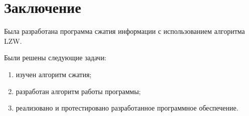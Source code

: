 \section*{Заключение}

Была разработана программа сжатия информации с использованием алгоритма LZW.

Были решены следующие задачи:
\begin{enumerate}
    \item изучен алгоритм сжатия;
    \item разработан алгоритм работы программы;
    \item реализовано и протестировано разработанное программное обеспечение.
\end{enumerate}


